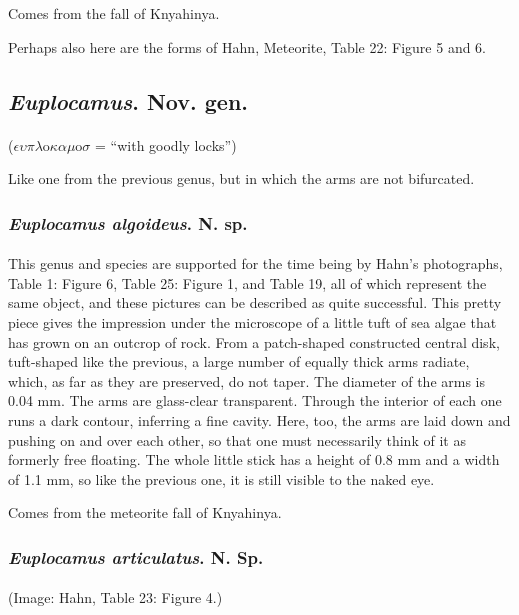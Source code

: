 \documentclass[a4paper, 12pt, oneside]{article}
\begin{document}
Comes from the fall of Knyahinya.

Perhaps also here are the forms of Hahn, Meteorite, Table 22: Figure 5 and 6.
\subsection{\emph{Euplocamus}. Nov. gen.}
\paragraph{}
($\epsilon\upsilon\pi\lambda$o$\kappa\alpha\mu$o$\sigma$ = ``with goodly locks'')%

Like one from the previous genus, but in which the arms are not bifurcated.
\subsubsection{\emph{Euplocamus algoideus}. N. sp.}
\paragraph{}
This genus and species are supported for the time being by Hahn's photographs, Table 1: Figure 6, Table 25: Figure 1, and Table 19, all of which represent the same object, and these pictures can be described as quite successful. This pretty piece gives the impression under the microscope of a little tuft of sea algae that has grown on an outcrop of rock. From a patch-shaped constructed central disk, tuft-shaped like the previous, a large number of equally thick arms radiate, which, as far as they are preserved, do not taper. The diameter of the arms is 0.04 mm. The arms are glass-clear transparent. Through the interior of each one runs a dark contour, inferring a fine cavity. Here, too, the arms are laid down and pushing on and over each other, so that one must necessarily think of it as formerly free floating. The whole little stick has a height of 0.8 mm and a width of 1.1 mm, so like the previous one, it is still visible to the naked eye.

Comes from the meteorite fall of Knyahinya.
\subsubsection{\emph{Euplocamus articulatus}. N. Sp.}
\paragraph{}
(Image: Hahn, Table 23: Figure 4.)
\end{document}
